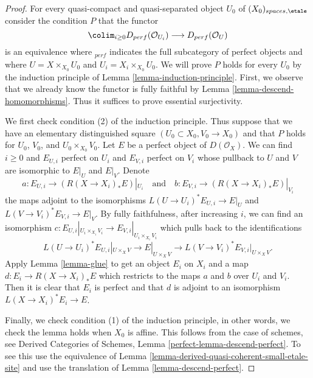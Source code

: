 \begin{proof}
For every quasi-compact and quasi-separated object $U_0$ of
$(X_0)_{spaces, \etale}$ consider the condition $P$ that
the functor
$$
\colim_{i \geq 0} D_{perf}(\mathcal{O}_{U_i})
\longrightarrow
D_{perf}(\mathcal{O}_U)
$$
is an equivalence where ${}_{perf}$ indicates the full subcategory of
perfect objects and where $U = X \times_{X_0} U_0$ and
$U_i = X_i \times_{X_0} U_0$. We will prove $P$ holds for every $U_0$
by the induction principle of Lemma \ref{lemma-induction-principle}.
First, we observe that we already know the functor is fully faithful
by Lemma \ref{lemma-descend-homomorphisms}. Thus it suffices to prove
essential surjectivity.

\medskip\noindent
We first check condition (2) of the induction principle. Thus suppose
that we have an elementary distinguished square
$(U_0 \subset X_0, V_0 \to X_0)$ and that $P$ holds for
$U_0$, $V_0$, and $U_0 \times_{X_0} V_0$. Let $E$ be a perfect object
of $D(\mathcal{O}_X)$. We can find $i \geq 0$ and $E_{U, i}$ perfect on $U_i$
and $E_{V, i}$ perfect on $V_i$ whose pullback to $U$ and $V$ are isomorphic
to $E|_U$ and $E|_V$. Denote
$$
a : E_{U, i} \to (R(X \to X_i)_*E)|_{U_i}
\quad\text{and}\quad
b : E_{V, i} \to (R(X \to X_i)_*E)|_{V_i}
$$
the maps adjoint to the isomorphisms $L(U \to U_i)^*E_{U, i} \to E|_U$
and $L(V \to V_i)^*E_{V, i} \to E|_V$. By fully faithfulness, after
increasing $i$, we can find an isomorphism
$c : E_{U, i}|_{U_i \times_{X_i} V_i} \to E_{V, i}|_{U_i \times_{X_i} V_i}$
which pulls back to the identifications 
$$
L(U \to U_i)^*E_{U, i}|_{U \times_X V} \to E|_{U \times_X V} \to
L(V \to V_i)^*E_{V, i}|_{U \times_X V}.
$$
Apply Lemma \ref{lemma-glue}
to get an object $E_i$ on $X_i$ and a map $d : E_i \to R(X \to X_i)_*E$
which restricts to the maps $a$ and $b$ over $U_i$ and $V_i$.
Then it is clear that $E_i$ is perfect and that
$d$ is adjoint to an isomorphism $L(X \to X_i)^*E_i \to E$.

\medskip\noindent
Finally, we check condition (1) of the induction principle, in other
words, we check the lemma holds when $X_0$ is affine.
This follows from the case of schemes, see
Derived Categories of Schemes, Lemma \ref{perfect-lemma-descend-perfect}.
To see this use the equivalence of
Lemma \ref{lemma-derived-quasi-coherent-small-etale-site}
and use the translation of Lemma \ref{lemma-descend-perfect}.
\end{proof}






